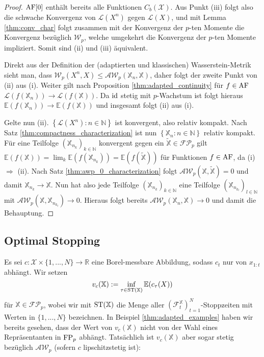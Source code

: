 \begin{proof}
$\operatorname{AF}[0]$ enthält bereits alle Funktionen $C_b(\mathcal{X})$. Aus Punkt (iii) folgt also die schwache Konvergenz von $\mathcal{L}(X^n)$ gegen $\mathcal{L}(X)$, und mit Lemma \ref{thm:conv_char} folgt zusammen mit der Konvergenz der $p$-ten Momente die Konvergenz bezüglich $\mathcal{W}_p$, welche umgekehrt die Konvergenz der $p$-ten Momente impliziert. Somit sind (ii) und (iii) äquivalent. 

Direkt aus der Definition der (adaptierten und klassischen) Wasserstein-Metrik sieht man, dass $\mathcal{W}_p(X^n, X) \leq \mathcal{AW}_p(\mathbb{X}_n, \mathbb{X})$, daher folgt der zweite Punkt von (ii) aus (i). Weiter gilt nach Proposition \ref{thm:adapted_continuity} für $f\in\operatorname{AF}$ $\mathcal{L}(f(\mathbb{X}_n)) \rightarrow \mathcal{L}(f(\mathbb{X}))$. Da $\operatorname{id}$ stetig mit $p$-Wachstum ist folgt hieraus $\mathbb{E}(f(\mathbb{X}_n)) \rightarrow \mathbb{E}(f(\mathbb{X}))$ und insgesamt folgt (ii) aus (i).

Gelte nun (ii). $\left\{ \mathcal{L}(X^n): n \in \mathbb{N}\right\}$ ist konvergent, also relativ kompakt. Nach Satz \ref{thm:compactness_characterization} ist nun $\left\{\mathbb{X}_n: n \in \mathbb{N}\right\}$ relativ kompakt. Für eine Teilfolge $\left(\mathbb{X}_{n_k}\right)_{k\in\mathbb{N}}$ konvergent gegen ein $\widetilde{\mathbb{X}} \in \mathcal{FP}_p$ gilt $\mathbb{E}(f(\mathbb{X})) = \lim_{k} \mathbb{E}(f(\mathbb{X}_{n_k})) = \mathbb{E}(f(\widetilde{\mathbb{X}}))$ für Funktionen $f \in \operatorname{AF}$, da (i) $\Rightarrow$ (ii). Nach Satz \ref{thm:awp_0_characterization} folgt $\mathcal{AW}_p(\mathbb{X}, \widetilde{\mathbb{X}})=0$ und damit $\mathbb{X}_{n_k} \rightarrow \mathbb{X}$. Nun hat also jede Teilfolge $\left(\mathbb{X}_{n_k}\right)_{k\in\mathbb{N}}$ eine Teilfolge $\left(\mathbb{X}_{n_{k_l}}\right)_{l\in\mathbb{N}}$ mit $\mathcal{AW}_p(\mathbb{X}, \mathbb{X}_{n_{k_l}}) \rightarrow 0$. Hieraus folgt bereits $\mathcal{AW}_p(\mathbb{X}_n, \mathbb{X}) \rightarrow 0$ und damit die Behauptung.
\end{proof}

\subsection{Optimal Stopping}
Es sei $c: \mathcal{X} \times \{1,...,N\} \rightarrow \mathbb{R}$ eine Borel-messbare Abbildung, sodass $c_t$ nur von $x_{1:t}$ abhängt. Wir setzen
\begin{equation}
    v_c(\mathbb{X}) := \inf\limits_{\tau \in \operatorname{ST}(\mathbb{X})} \mathbb{E}(c_\tau(X))
\end{equation}
für $\mathbb{X} \in \mathcal{FP}_p$, wobei wir mit $\operatorname{ST}(\mathbb{X})$ die Menge aller $\left(\mathcal{F}_t^\mathbb{X}\right)_{t=1}^N$-Stoppzeiten mit Werten in $\{1,...,N\}$ bezeichnen. In Beispiel \ref{thm:adapted_examples} haben wir bereits gesehen, dass der Wert von $v_c(\mathbb{X})$ nicht von der Wahl eines Repräsentanten in $\operatorname{FP}_p$ abhängt. Tatsächlich ist $v_c(\mathbb{X})$ aber sogar stetig bezüglich $\mathcal{AW}_p$ (sofern $c$ lipschitzstetig ist):

